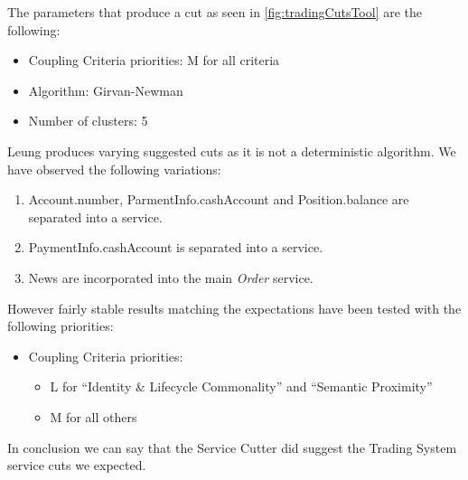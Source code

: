 The parameters that produce a cut as seen in \ref{fig:tradingCutsTool} are the following:

\begin{itemize}
\item Coupling Criteria priorities: M for all criteria
\item Algorithm: Girvan-Newman
\item Number of clusters: 5
\end{itemize}

Leung produces varying suggested cuts as it is not a deterministic algorithm. We have observed the following variations:

\begin{enumerate}
\item Account.number, ParmentInfo.cashAccount and Position.balance are separated into a service.
\item PaymentInfo.cashAccount is separated into a service.
\item News are incorporated into the main \textit{Order} service.
\end{enumerate}

However fairly stable results matching the expectations have been tested with the following priorities:

\begin{itemize}
\item Coupling Criteria priorities:
	\begin{itemize}
	\item L for \enquote{Identity \& Lifecycle Commonality} and \enquote{Semantic Proximity}
	\item M for all others
	\end{itemize}
\end{itemize}

In conclusion we can say that the Service Cutter did suggest the Trading System service cuts we expected.